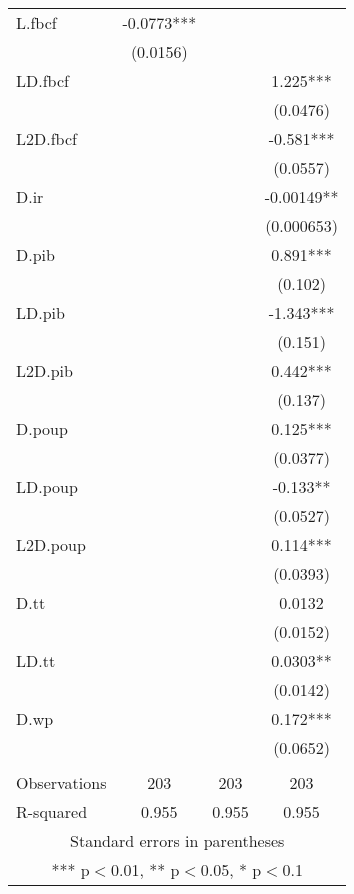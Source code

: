 \begin{tabular}{lccc}
L.fbcf & -0.0773*** &  &  \\
 & (0.0156) &  &  \\
LD.fbcf &  &  & 1.225*** \\
 &  &  & (0.0476) \\
L2D.fbcf &  &  & -0.581*** \\
 &  &  & (0.0557) \\
D.ir &  &  & -0.00149** \\
 &  &  & (0.000653) \\
D.pib &  &  & 0.891*** \\
 &  &  & (0.102) \\
LD.pib &  &  & -1.343*** \\
 &  &  & (0.151) \\
L2D.pib &  &  & 0.442*** \\
 &  &  & (0.137) \\
D.poup &  &  & 0.125*** \\
 &  &  & (0.0377) \\
LD.poup &  &  & -0.133** \\
 &  &  & (0.0527) \\
L2D.poup &  &  & 0.114*** \\
 &  &  & (0.0393) \\
D.tt &  &  & 0.0132 \\
 &  &  & (0.0152) \\
LD.tt &  &  & 0.0303** \\
 &  &  & (0.0142) \\
D.wp &  &  & 0.172*** \\
 &  &  & (0.0652) \\
 &  &  &  \\
Observations & 203 & 203 & 203 \\
 R-squared & 0.955 & 0.955 & 0.955 \\ \hline
\multicolumn{4}{c}{ Standard errors in parentheses} \\
\multicolumn{4}{c}{ *** p$<$0.01, ** p$<$0.05, * p$<$0.1} \\
\end{tabular}
